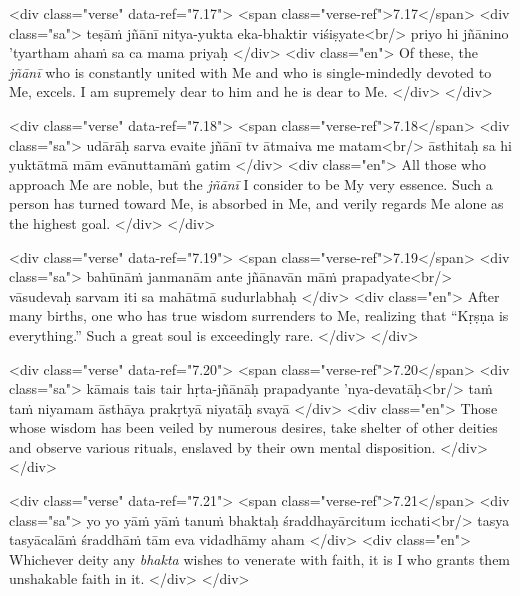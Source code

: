 \begin{html}
<div class="verse" data-ref="7.17">
  <span class="verse-ref">7.17</span>
  <div class="sa">
    teṣāṁ jñānī nitya-yukta eka-bhaktir viśiṣyate<br/>
    priyo hi jñānino ’tyartham ahaṁ sa ca mama priyaḥ
  </div>
  <div class="en">
    Of these, the \textit{jñānī} who is constantly united with Me and who is single-mindedly devoted to Me, excels. I am supremely dear to him and he is dear to Me.
  </div>
</div>
\end{html}



\begin{html}
<div class="verse" data-ref="7.18">
  <span class="verse-ref">7.18</span>
  <div class="sa">
    udārāḥ sarva evaite jñānī tv ātmaiva me matam<br/>
    āsthitaḥ sa hi yuktātmā mām evānuttamāṁ gatim
  </div>
  <div class="en">
    All those who approach Me are noble, but the \textit{jñānī} I consider to be My very essence. Such a person has turned toward Me, is absorbed in Me, and verily regards Me alone as the highest goal.
  </div>
</div>
\end{html}



\begin{html}
<div class="verse" data-ref="7.19">
  <span class="verse-ref">7.19</span>
  <div class="sa">
    bahūnāṁ janmanām ante jñānavān māṁ prapadyate<br/>
    vāsudevaḥ sarvam iti sa mahātmā sudurlabhaḥ
  </div>
  <div class="en">
    After many births, one who has true wisdom surrenders to Me, realizing that \enquote{Kṛṣṇa is everything.} Such a great soul is exceedingly rare.
  </div>
</div>
\end{html}



\begin{html}
<div class="verse" data-ref="7.20">
  <span class="verse-ref">7.20</span>
  <div class="sa">
    kāmais tais tair hṛta-jñānāḥ prapadyante ’nya-devatāḥ<br/>
    taṁ taṁ niyamam āsthāya prakṛtyā niyatāḥ svayā
  </div>
  <div class="en">
    Those whose wisdom has been veiled by numerous desires, take shelter of other deities and observe various rituals, enslaved by their own mental disposition.
  </div>
</div>
\end{html}



\begin{html}
<div class="verse" data-ref="7.21">
  <span class="verse-ref">7.21</span>
  <div class="sa">
    yo yo yāṁ yāṁ tanuṁ bhaktaḥ śraddhayārcitum icchati<br/>
    tasya tasyācalāṁ śraddhāṁ tām eva vidadhāmy aham
  </div>
  <div class="en">
    Whichever deity any \textit{bhakta} wishes to venerate with faith, it is I who grants them unshakable faith in it.
  </div>
</div>
\end{html}



